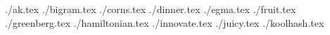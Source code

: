\documentclass[11pt,letterpaper,oneside]{article}
\newcommand{\importproblem}[2]{{./#2.tex}}
\begin{document}


\importproblem{a}{ak}
\importproblem{b}{bigram}
\importproblem{c}{corns}
\importproblem{d}{dinner}
\importproblem{e}{egma}
\importproblem{f}{fruit}
\importproblem{g}{greenberg}
\importproblem{h}{hamiltonian}
\importproblem{i}{innovate}
\importproblem{j}{juicy}
\importproblem{k}{koolhash}
\end{document}
